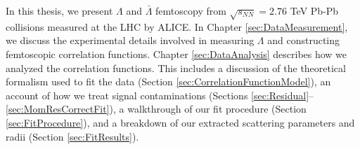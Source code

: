 
In this thesis, we present $\Lambda$ and $\bar{\Lambda}$ femtoscopy from $\sqrt{s_{NN}}=2.76$ TeV Pb-Pb collisions measured at the LHC by ALICE.
In Chapter \ref{sec:DataMeasurement}, we discuss the experimental details involved in measuring $\Lambda$ and constructing femtoscopic correlation functions.
Chapter \ref{sec:DataAnalysis} describes how we analyzed the correlation functions.
This includes a discussion of the theoretical formalism used to fit the data (Section \ref{sec:CorrelationFunctionModel}), an account of how we treat signal contaminations (Sections \ref{sec:Residual}--\ref{sec:MomResCorrectFit}), a walkthrough of our fit procedure (Section \ref{sec:FitProcedure}), and a breakdown of our extracted scattering parameters and radii (Section \ref{sec:FitResults}).





